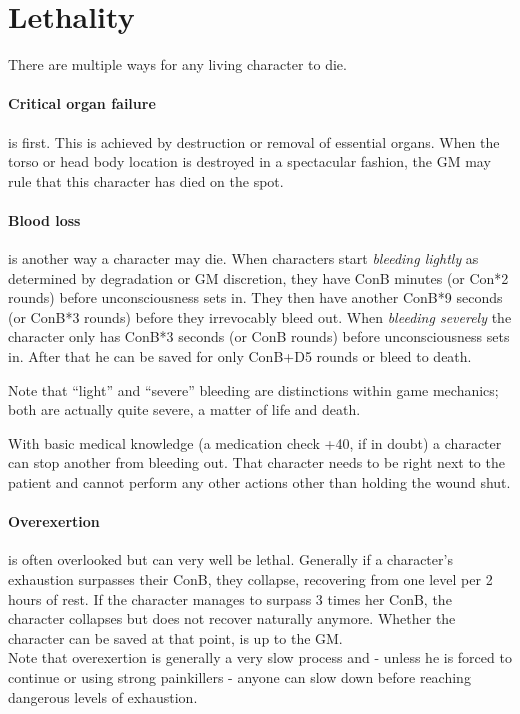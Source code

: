 \documentclass[12pt,a4paper,openany,usenames,dvipsnames]{book}
\begin{document}
	\section{Lethality}
	\label{sec:lethality}
	There are multiple ways for any living character to die.
	\paragraph{Critical organ failure}is first. This is achieved by destruction or removal of essential organs. When the torso or head body location is destroyed in a spectacular fashion, the GM may rule that this character has died on the spot.
	\paragraph{Blood loss}is another way a character may die. When characters start \emph{bleeding lightly} as determined by degradation or GM discretion, they have ConB minutes (or Con*2 rounds) before unconsciousness sets in.
	They then have another ConB*9 seconds (or ConB*3 rounds) before they irrevocably bleed out. When \emph{bleeding severely} the character only has ConB*3 seconds (or ConB rounds) before unconsciousness sets in.
	After that he can be saved for only ConB+D5 rounds or bleed to death.
	\begin{exampleblock}
		Note that “light” and “severe” bleeding are distinctions within game mechanics;
		both are actually quite severe, a matter of life and death.
	\end{exampleblock}
	With basic medical knowledge (a medication check +40, if in doubt) a character can stop another from bleeding out. That character needs to be right next to the patient and cannot perform any other actions other than holding the wound shut.
	\paragraph{Overexertion} is often overlooked but can very well be lethal. Generally if a character’s exhaustion surpasses their ConB, they collapse, recovering from one level per 2 hours of rest. If the character manages to surpass 3 times her ConB, the character collapses but does not recover naturally anymore. Whether the character can be saved at that point, is up to the GM.\\
	Note that overexertion is generally a very slow process
		and - unless he is forced to continue or using strong painkillers -
		anyone can slow down before reaching dangerous levels of exhaustion.
\end{document}

